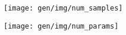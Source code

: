 \centering
\begin{subfigure}[h]{.45\textwidth}
  \centering
  \texttt{[image: gen/img/num\_samples]}
  \caption{}
  \label{fig:sample-counts}
\end{subfigure}
\hfill
\begin{subfigure}[h]{.45\textwidth}
  \centering
  \texttt{[image: gen/img/num\_params]}
  \caption{}
  \label{fig:param-counts}
\end{subfigure}
